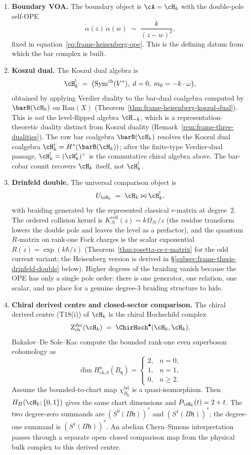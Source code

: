 \begin{enumerate}
\item \textbf{Boundary VOA.}
The boundary object is $\cA = \cH_k$ with the double-pole self-OPE
\[
 \alpha(z)\,\alpha(w) \;\sim\; \frac{k}{(z-w)^2},
\]
fixed in equation~\eqref{eq:frame-heisenberg-ope}. This is the
defining datum from which the bar complex is built.

\item \textbf{Koszul dual.}
The Koszul dual algebra is
\[
 \cH_k^! \;=\; \bigl(\mathrm{Sym}^{\mathrm{ch}}(V^*),\;
 d = 0,\; m_0 = -k\cdot\omega\bigr),
\]
obtained by applying Verdier duality to the bar-dual coalgebra
computed by $\barB(\cH_k)$ on $\mathrm{Ran}(X)$
(Theorem~\ref{thm:frame-heisenberg-koszul-dual}). This is
\emph{not} the level-flipped algebra $\cH_{-k}$, which is a
representation-theoretic duality distinct from Koszul duality
(Remark~\ref{rem:frame-three-dualities}). The raw bar coalgebra
$\barB(\cH_k)$ resolves the Koszul dual coalgebra
$\cH_k^i=H^*(\barB(\cH_k))$; after the finite-type Verdier-dual
passage, $\cH_k^!=(\cH_k^i)^\vee$ is the commutative chiral
algebra above. The bar-cobar counit recovers $\cH_k$ itself, not
$\cH_k^!$.

\item \textbf{Drinfeld double.}
The universal comparison object is
\[
 U_{\cH_k}
 \;=\;
 \cH_k \bowtie \cH_k^!,
\]
with braiding generated by the represented classical $r$-matrix at
degree~$2$.  The ordered collision kernel is
$K_{\mathcal H}^{\mathrm{coll}}(z)=k\Omega_{\mathcal H}/z$ (the residue transform lowers
the double pole and leaves the level as a prefactor), and the quantum
$R$-matrix on rank-one Fock charges is the scalar
exponential $R(z) = \exp(k\hbar/z)$
(Theorem~\ref{thm:rosetta-cs-r-matrix} for the odd current variant;
the Heisenberg version is derived in
\S\ref{subsec:frame-thesis-drinfeld-double} below). Higher degrees
of the braiding vanish because the OPE has only a single pole
order: there is one generator, one relation, one scalar, and no
place for a genuine degree-$3$ braiding structure to hide.

\item \textbf{Chiral derived centre and closed-sector comparison.}
The chiral derived centre (T18(i)) of $\cH_k$ is the chiral
Hochschild complex
\[
 \mathrm{Z}^{\mathrm{der}}_{\mathrm{ch}}(\cH_k)
 \;=\;
 \ChirHoch^{\bullet}(\cH_k,\cH_k).
\]
Bakalov--De Sole--Kac compute the bounded rank-one even superboson
cohomology as
\[
 \dim H^n_{\mathrm{ch},b}(B_{\mathfrak h})
 =\begin{cases}2,&n=0,\\1,&n=1,\\0,&n\geq2.\end{cases}
\]
Assume the bounded-to-chart map
$\chi_{B_{\mathfrak h}}^{\mathrm{bd}}$ is a quasi-isomorphism.
Then $H_H(\cH_k;\{0,1\})$ gives the same chart dimensions and
$P_{\cH_k}(t)=2+t$.  The two degree-zero summands are
$(S^0(\Pi\mathfrak h))^*$ and $(S^1(\Pi\mathfrak h))^*$; the
degree-one summand is $(S^1(\Pi\mathfrak h))^*$.  An abelian
Chern--Simons interpretation passes through a separate open--closed
comparison map from the physical bulk complex to this derived centre.


\end{enumerate}
